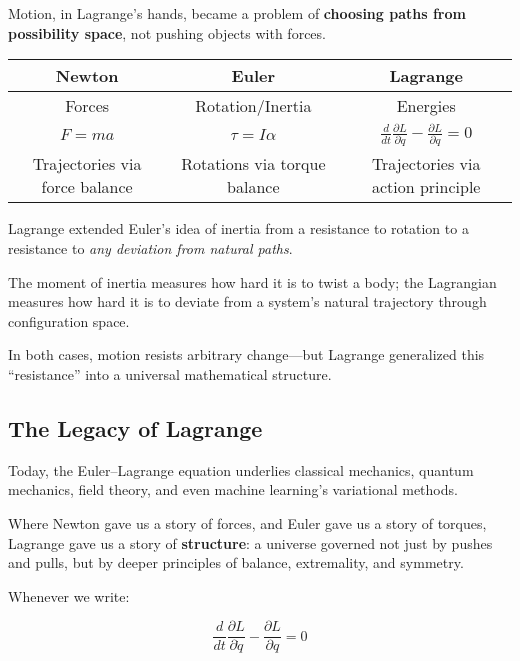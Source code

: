 Motion, in Lagrange’s hands, became a problem of \textbf{choosing paths from possibility space}, not pushing objects with forces.

\begin{center}
\begin{tabular}{c|c|c}
\textbf{Newton} & \textbf{Euler} & \textbf{Lagrange} \\
\hline
Forces & Rotation/Inertia & Energies \\
\( F = ma \) & \( \tau = I \alpha \) & \( \frac{d}{dt} \frac{\partial L}{\partial \dot{q}} - \frac{\partial L}{\partial q} = 0 \) \\
Trajectories via force balance & Rotations via torque balance & Trajectories via action principle \\
\end{tabular}
\end{center}

\begin{tcolorbox}[colback=blue!5!white, colframe=blue!50!black, 
  title={Historical Sidebar: From Inertia to Extremality}]
  
Lagrange extended Euler’s idea of inertia from a resistance to rotation to a resistance to \textit{any deviation from natural paths}.

The moment of inertia measures how hard it is to twist a body; the Lagrangian measures how hard it is to deviate from a system’s natural trajectory through configuration space.

In both cases, motion resists arbitrary change—but Lagrange generalized this “resistance” into a universal mathematical structure.
\end{tcolorbox}

\subsection{The Legacy of Lagrange}

Today, the Euler–Lagrange equation underlies classical mechanics, quantum mechanics, field theory, and even machine learning’s variational methods.

Where Newton gave us a story of forces, and Euler gave us a story of torques, Lagrange gave us a story of \textbf{structure}: a universe governed not just by pushes and pulls, but by deeper principles of balance, extremality, and symmetry.

Whenever we write:

\[
\frac{d}{dt} \frac{\partial L}{\partial \dot{q}} - \frac{\partial L}{\partial q} = 0
\]

